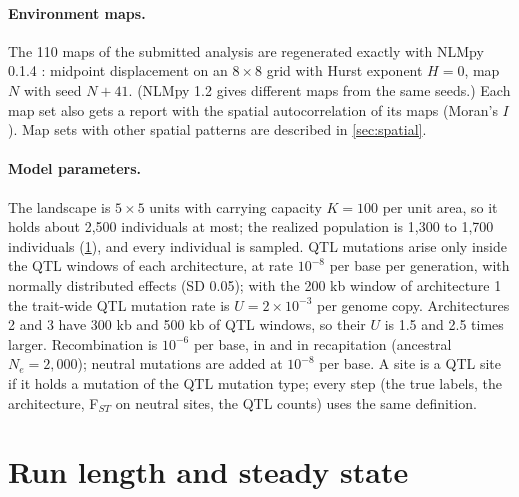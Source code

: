 \paragraph{Environment maps.} The 110 maps of the submitted analysis are
regenerated exactly with NLMpy 0.1.4 \citep{etherington_nlmpy_2015}:
midpoint displacement on an $8\times8$ grid with Hurst exponent $H=0$, map
$N$ with seed $N+41$. (NLMpy 1.2 gives different maps from the same seeds.)
Each map set also gets a report with the spatial autocorrelation of its
maps (Moran's $I$). Map sets with other spatial patterns are described in
\cref{sec:spatial}.

\paragraph{Model parameters.} The landscape is $5\times5$ units with
carrying capacity $K=100$ per unit area, so it holds about 2,500
individuals at most; the realized population is 1,300 to 1,700 individuals
(\cref{sec:runlength}), and every individual is sampled. QTL mutations
arise only inside the QTL windows of each architecture, at rate
$10^{-8}$ per base per generation, with normally distributed effects (SD
0.05); with the 200 kb window of architecture 1 the trait-wide QTL mutation
rate is $U = 2\times10^{-3}$ per genome copy. Architectures 2 and 3 have
300 kb and 500 kb of QTL windows, so their $U$ is 1.5 and 2.5 times
larger. Recombination is $10^{-6}$ per base, in \slim and in
recapitation (ancestral $N_e = 2{,}000$); neutral mutations are added at
$10^{-8}$ per base. A site is a QTL site if it holds a mutation of the
QTL mutation type; every step (the true labels, the architecture, F$_{ST}$
on neutral sites, the QTL counts) uses the same definition.



\section{Run length and steady state}
\label{sec:runlength}

